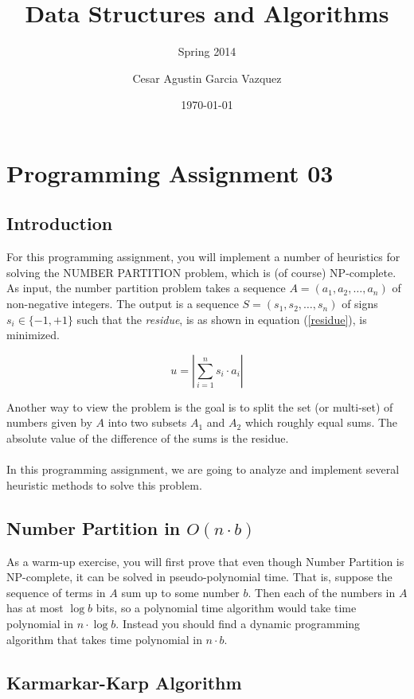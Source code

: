 \documentclass[tikz, 12pt]{scrartcl}
\title{Data Structures and Algorithms}
\subtitle{Spring 2014}
\author{Cesar Agustin Garcia Vazquez}
\date{\today}                                           %
\begin{document}
\maketitle
\section{Programming Assignment 03}

\subsection{Introduction}

For this programming assignment, you will implement a number of heuristics for solving the NUMBER PARTITION problem, which is (of course) NP-complete. As input, the number partition problem takes a sequence $A = (a_1, a_2, \ldots, a_n)$ of non-negative integers. The output is a sequence $S = (s_1, s_2, \ldots, s_n)$ of signs $s_i \in \{ -1, +1 \}$ such that the \textit{residue}, is as shown in equation (\ref{residue}), is minimized.

\begin{equation}\label{residue}
u = \left| \sum_{i = 1}^n s_i \cdot a_i \right|
\end{equation}

Another way to view the problem is the goal is to split the set (or multi-set) of numbers given by $A$ into two subsets $A_1$ and $A_2$ which roughly equal sums. The absolute value of the difference of the sums is the residue.\\
\\
In this programming assignment, we are going to analyze and implement several heuristic methods to solve this problem.

\subsection{Number Partition in $O(n \cdot b)$}

As a warm-up exercise, you will first prove that even though Number Partition is NP-complete, it can be solved in pseudo-polynomial time. That is, suppose the sequence of terms in $A$ sum up to some number $b$. Then each of the numbers in $A$ has at most $\log b$ bits, so a polynomial time algorithm would take time polynomial in $n \cdot \log b$. Instead you should find a dynamic programming algorithm that takes time polynomial in $n \cdot b$.

\subsection{Karmarkar-Karp Algorithm}
\end{document}
